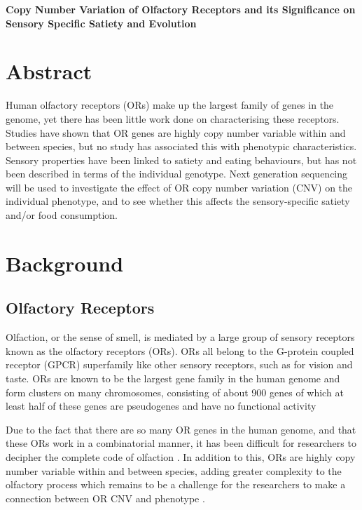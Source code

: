 \documentclass[a4paper, 12pt]{article}
\begin{document}
\begin{center}
    \Large{\textbf{Copy Number Variation of Olfactory Receptors and its Significance on Sensory Specific Satiety and Evolution}}
\end{center}

\section*{Abstract}

Human olfactory receptors (ORs) make up the largest family of genes in the genome, yet there has been little work done on characterising these receptors.
Studies have shown that OR genes are highly copy number variable within and between species, but no study has associated this with phenotypic characteristics.
Sensory properties have been linked to satiety and eating behaviours, but has not been described in terms of the individual genotype.
Next generation sequencing will be used to investigate the effect of OR copy number variation (CNV) on the individual phenotype, and to see whether this affects the sensory-specific satiety and/or food consumption.

\section*{Background}

\subsection*{Olfactory Receptors}

Olfaction, or the sense of smell, is mediated by a large group of sensory receptors known as the olfactory receptors (ORs).
ORs all belong to the G-protein coupled receptor (GPCR) superfamily like other sensory receptors, such as for vision and taste.
ORs are known to be the largest gene family in the human genome and form clusters on many chromosomes, consisting of about 900 genes of which at least half of these genes are pseudogenes and have no functional activity \citep{Glusman2001,Niimura2005}

Due to the fact that there are so many OR genes in the human genome, and that these ORs work in a combinatorial manner, it has been difficult for researchers to decipher the complete code of olfaction \citep{Hasin-Brumshtein2009, Nei2008}.
In addition to this, ORs are highly copy number variable within and between species, adding greater complexity to the olfactory process which remains to be a challenge for the researchers to make a connection between OR CNV and phenotype \citep{Nozawa2007}.
\end{document}
